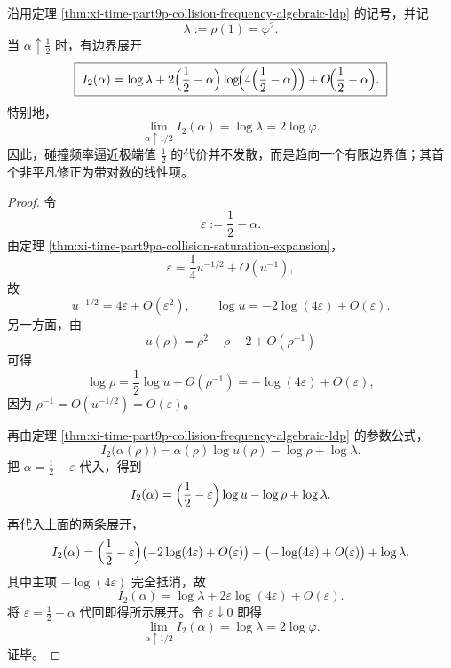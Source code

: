 \begin{theorem}[碰撞率函数饱和端点的有限边界代价与对数首修正]\label{thm:xi-time-part9pa-collision-boundary-rate-finite}
沿用定理 \ref{thm:xi-time-part9p-collision-frequency-algebraic-ldp} 的记号，并记
\[
\lambda:=\rho(1)=\varphi^2.
\]
当 \(\alpha\uparrow \frac12\) 时，有边界展开
\[
\boxed{\;
I_2(\alpha)
=
\log\lambda
+2\Bigl(\frac12-\alpha\Bigr)\log\!\Bigl(4\Bigl(\frac12-\alpha\Bigr)\Bigr)
+O\!\Bigl(\frac12-\alpha\Bigr).\;}
\]
特别地，
\[
\boxed{\;
\lim_{\alpha\uparrow 1/2}I_2(\alpha)=\log\lambda=2\log\varphi.\;}
\]
因此，碰撞频率逼近极端值 \(\frac12\) 的代价并不发散，而是趋向一个有限边界值；其首个非平凡修正为带对数的线性项。
\end{theorem}
\begin{proof}
令
\[
\varepsilon:=\frac12-\alpha.
\]
由定理 \ref{thm:xi-time-part9pa-collision-saturation-expansion}，
\[
\varepsilon=\frac14u^{-1/2}+O(u^{-1}),
\]
故
\[
u^{-1/2}=4\varepsilon+O(\varepsilon^2),
\qquad
\log u=-2\log(4\varepsilon)+O(\varepsilon).
\]
另一方面，由
\[
u(\rho)=\rho^2-\rho-2+O(\rho^{-1})
\]
可得
\[
\log\rho=\frac12\log u+O(\rho^{-1})
=
-\log(4\varepsilon)+O(\varepsilon),
\]
因为 \(\rho^{-1}=O(u^{-1/2})=O(\varepsilon)\)。

再由定理 \ref{thm:xi-time-part9p-collision-frequency-algebraic-ldp} 的参数公式，
\[
I_2\bigl(\alpha(\rho)\bigr)
=
\alpha(\rho)\log u(\rho)-\log\rho+\log\lambda.
\]
把 \(\alpha=\frac12-\varepsilon\) 代入，得到
\[
I_2(\alpha)
=
\Bigl(\frac12-\varepsilon\Bigr)\log u-\log\rho+\log\lambda.
\]
再代入上面的两条展开，
\[
I_2(\alpha)
=
\Bigl(\frac12-\varepsilon\Bigr)\bigl(-2\log(4\varepsilon)+O(\varepsilon)\bigr)
-\bigl(-\log(4\varepsilon)+O(\varepsilon)\bigr)
+\log\lambda.
\]
其中主项 \(-\log(4\varepsilon)\) 完全抵消，故
\[
I_2(\alpha)
=
\log\lambda+2\varepsilon\log(4\varepsilon)+O(\varepsilon).
\]
将 \(\varepsilon=\frac12-\alpha\) 代回即得所示展开。令 \(\varepsilon\downarrow 0\) 即得
\[
\lim_{\alpha\uparrow 1/2}I_2(\alpha)=\log\lambda=2\log\varphi.
\]
证毕。
\end{proof}

\endinput
